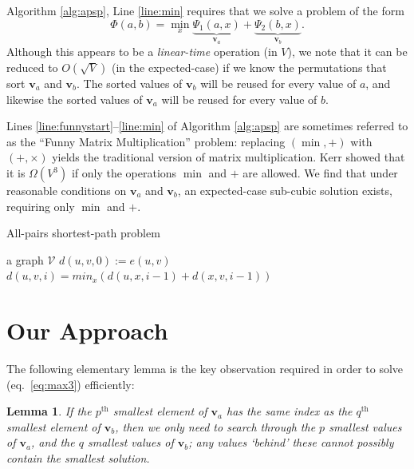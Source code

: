 \documentclass[a4paper,10pt]{article}
\newtheorem{lemma}[theorem]{Lemma}
\newcommand{\eq}[1]{(eq.~\ref{#1})}
\begin{document}
Algorithm \ref{alg:apsp}, Line \ref{line:min} requires that we solve a problem of the form
\begin{equation}
 \Phi(a,b) = \min_{x} \underbrace{\Psi_1(a,x)}_{\mathbf{v}_a} + \underbrace{\Psi_2(b,x)}_{\mathbf{v}_b}.
\label{eq:max3}
\end{equation}
Although this appears to be a \emph{linear-time} operation (in $V$), we note that it can be reduced to $O(\sqrt{V})$ (in the expected-case) if we know the permutations that sort $\mathbf{v}_a$ and $\mathbf{v}_b$. The sorted values of $\mathbf{v}_b$ will be reused for every value of $a$, and likewise the sorted values of $\mathbf{v}_a$ will be reused for every value of $b$.

Lines \ref{line:funnystart}--\ref{line:min} of Algorithm \ref{alg:apsp} are sometimes referred to as the ``Funny Matrix Multiplication'' problem: replacing $(\min, +)$ with $(+, \times)$ yields the traditional version of matrix multiplication. Kerr \cite{Kerr70} showed that it is $\Omega(V^3)$ if only the operations $\min$ and $+$ are allowed. We find that under reasonable conditions on $\mathbf{v}_a$ and $\mathbf{v}_b$, an expected-case sub-cubic solution exists, requiring only $\min$ and $+$.

\begin{algorithm}
 \caption{All-pairs shortest-path problem}
 \label{alg:apsp}
\begin{algorithmic}[1]
 \REQUIRE a graph $\mathcal V$
     \STATE $d(u,v,0) := e(u,v)$
   \ENDFOR
 \ENDFOR
    \label{line:funnystart}
       \STATE $d(u,v,i) = min_x\left( d(u,x,i-1) + d(x,v,i-1) \right)$  \label{line:min}
     \ENDFOR
   \ENDFOR\ 
 \ENDFOR\ 
\end{algorithmic}
\end{algorithm}

\section{Our Approach}

The following elementary lemma is the key observation required in order to solve \eq{eq:max3} efficiently:

\begin{lemma}
If the $p^\text{th}$ smallest element of $\mathbf{v}_a$ has the same index as the $q^\text{th}$ smallest element of $\mathbf{v}_b$, then we only need to search through the $p$ smallest values of $\mathbf{v}_a$, and the $q$ smallest values of $\mathbf{v}_b$; any values `behind' these cannot possibly contain the smallest solution.
\label{main_lemma}
\end{lemma}
\end{document}

